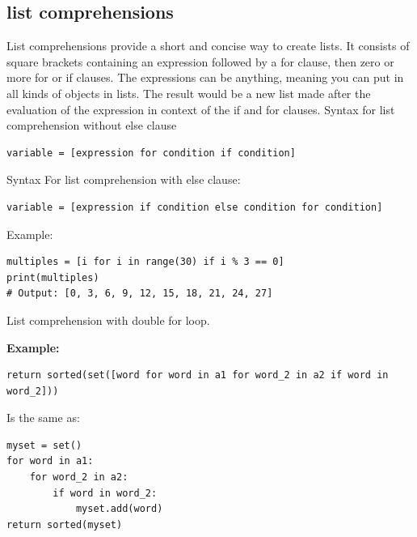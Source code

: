 \documentclass{report}
\begin{document}
    \subsection{list comprehensions}
    \bigbreak \noindent
    List comprehensions provide a short and concise way to create lists. It consists of square brackets containing an expression followed by a for clause, then zero or more for or if clauses. The expressions can be anything, meaning you can put in all kinds of objects in lists. The result would be a new list made after the evaluation of the expression in context of the if and for clauses.
    \bigbreak \noindent 
    Syntax for list comprehension without else clause
    \begin{verbatim}
variable = [expression for condition if condition]
    \end{verbatim}
    \bigbreak \noindent 
    Syntax For list comprehension with else clause:
    \begin{verbatim}
variable = [expression if condition else condition for condition]
    \end{verbatim}
    \bigbreak \noindent 
    Example:
    \begin{verbatim}
multiples = [i for i in range(30) if i % 3 == 0]
print(multiples)
# Output: [0, 3, 6, 9, 12, 15, 18, 21, 24, 27]
    \end{verbatim}
    \bigbreak \noindent 
    \bigbreak \noindent 

    \bigbreak \noindent \bigbreak \noindent 
    List comprehension with double for loop.
    \bigbreak \noindent 
    \begin{mdframed}
        \textbf{Example:}
        \begin{verbatim}
return sorted(set([word for word in a1 for word_2 in a2 if word in word_2]))
        \end{verbatim}
        \bigbreak \noindent 
        Is the same as:
        \begin{verbatim}
myset = set()
for word in a1:
    for word_2 in a2:
        if word in word_2:
            myset.add(word)
return sorted(myset)
        \end{verbatim}
    \end{mdframed}


    \pagebreak \bigbreak \noindent
\end{document}
